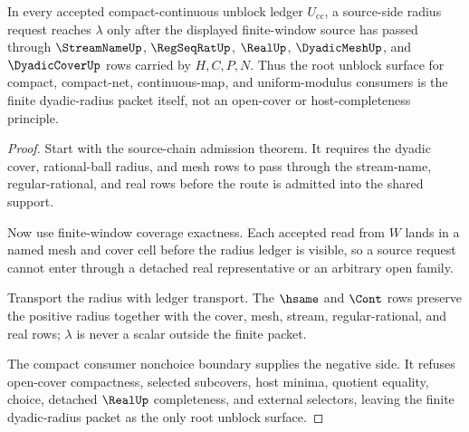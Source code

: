 \begin{theorem}
\label{thm:finite-lebesgue-number-source-radius-unblock}
In every accepted compact-continuous unblock ledger $U_{\mathrm{cc}}$, a source-side radius request reaches $\lambda$ only after the displayed finite-window source has passed through $\StreamNameUp$, $\RegSeqRatUp$, $\RealUp$, $\DyadicMeshUp$, and $\DyadicCoverUp$ rows carried by $H,C,P,N$. Thus the root unblock surface for compact, compact-net, continuous-map, and uniform-modulus consumers is the finite dyadic-radius packet itself, not an open-cover or host-completeness principle.
\end{theorem}
\begin{proof}
Start with the source-chain admission theorem. It requires the dyadic cover, rational-ball radius, and mesh rows to pass through the stream-name, regular-rational, and real rows before the route is admitted into the shared support.

Now use finite-window coverage exactness. Each accepted read from $W$ lands in a named mesh and cover cell before the radius ledger is visible, so a source request cannot enter through a detached real representative or an arbitrary open family.

Transport the radius with ledger transport. The $\hsame$ and $\Cont$ rows preserve the positive radius together with the cover, mesh, stream, regular-rational, and real rows; $\lambda$ is never a scalar outside the finite packet.

The compact consumer nonchoice boundary supplies the negative side. It refuses open-cover compactness, selected subcovers, host minima, quotient equality, choice, detached $\RealUp$ completeness, and external selectors, leaving the finite dyadic-radius packet as the only root unblock surface.
\end{proof}

